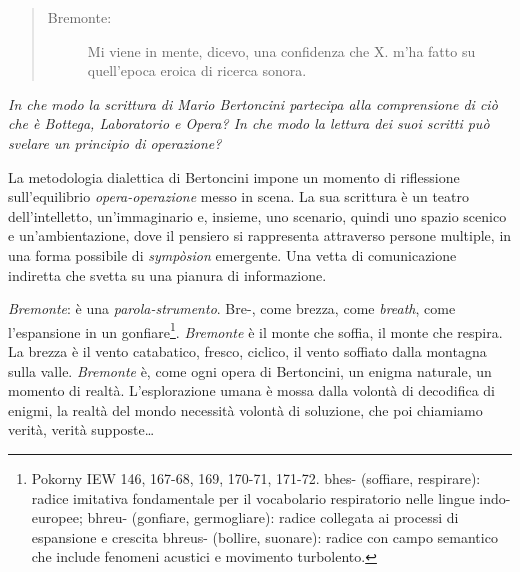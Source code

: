 \begin{quote}
  \begin{sf}
    \small
    \begin{description}
      \item[Bremonte:] Mi viene in mente, dicevo, una confidenza che X. m’ha
      fatto su quell’epoca eroica di ricerca sonora. \cite{bertoncini07}
    \end{description}
  \end{sf}
\end{quote}

\emph{In che modo la scrittura di Mario Bertoncini partecipa alla comprensione
di ciò che è Bottega, Laboratorio e Opera? In che modo la lettura dei suoi
scritti può svelare un principio di operazione?}

La metodologia dialettica di Bertoncini impone un momento di riflessione
sull'equilibrio \emph{opera-operazione} messo in scena. La sua scrittura è un
teatro dell'intelletto, un'immaginario e, insieme, uno scenario, quindi uno
spazio scenico e un'ambientazione, dove il pensiero si rappresenta attraverso
persone multiple, in una forma possibile di \emph{sympòsion} emergente. Una
vetta di comunicazione indiretta \cite{ronchi2001} che svetta su una pianura di
informazione.

\emph{Bremonte}: è una \emph{parola-strumento}. {\phonfont *Bre-}, come brezza,
come \emph{breath}, come l'espansione in un gonfiare\footnote{Pokorny IEW 146,
  167-68, 169, 170-71, 171-72. {\phonfont *bhes-} (soffiare, respirare): radice
  imitativa fondamentale per il vocabolario respiratorio nelle lingue indo-europee;
  {\phonfont *bhreu-} (gonfiare, germogliare): radice collegata ai processi di
  espansione e crescita {\phonfont *bhreus-} (bollire, suonare): radice con campo
  semantico che include fenomeni acustici e movimento turbolento.}.
\emph{Bremonte} è il monte che soffia, il monte che respira. La brezza è il vento
catabatico, fresco, ciclico, il vento soffiato dalla montagna sulla valle.
\emph{Bremonte} è, come ogni opera di Bertoncini, un enigma naturale, un momento
di realtà. L'esplorazione umana è mossa dalla volontà di decodifica di enigmi,
la realtà del mondo necessità volontà di soluzione, che poi chiamiamo verità,
verità supposte\ldots~%

